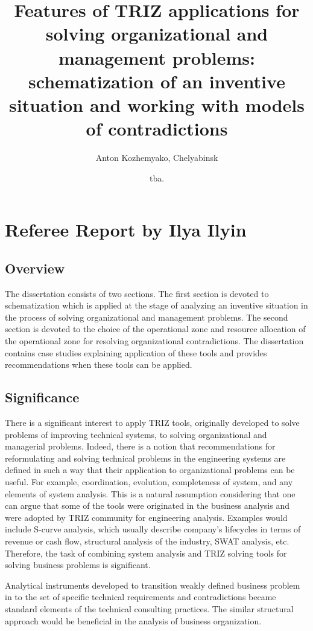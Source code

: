 \documentclass[11pt,a4paper]{article}
\title{Features of TRIZ applications for solving organizational and management
  problems: schematization of an inventive situation and working with models
  of contradictions}
\author{Anton Kozhemyako, Chelyabinsk}
\date{tba.}
\begin{document}
\maketitle


\section{Referee Report by Ilya Ilyin}

\subsection*{Overview}
The dissertation consists of two sections. The first section is devoted to
schematization which is applied at the stage of analyzing an inventive
situation in the process of solving organizational and management problems.
The second section is devoted to the choice of the operational zone and
resource allocation of the operational zone for resolving organizational
contradictions. The dissertation contains case studies explaining application
of these tools and provides recommendations when these tools can be applied.

\subsection*{Significance}
There is a significant interest to apply TRIZ tools, originally developed to
solve problems of improving technical systems, to solving organizational and
managerial problems.  Indeed, there is a notion that recommendations for
reformulating and solving technical problems in the engineering systems are
defined in such a way that their application to organizational problems can be
useful. For example, coordination, evolution, completeness of system, and any
elements of system analysis. This is a natural assumption considering that one
can argue that some of the tools were originated in the business analysis and
were adopted by TRIZ community for engineering analysis.  Examples would
include S-curve analysis, which usually describe company’s lifecycles in terms
of revenue or cash flow, structural analysis of the industry, SWAT analysis,
etc.  Therefore, the task of combining system analysis and TRIZ solving tools
for solving business problems is significant.

Analytical instruments developed to transition weakly defined business problem
in to the set of specific technical requirements and contradictions became
standard elements of the technical consulting practices. The similar
structural approach would be beneficial in the analysis of business
organization.
\end{document}
